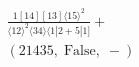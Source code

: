 \documentclass[varwidth, border=5pt]{standalone}
\begin{document}
\begin{my}
$\begin{gathered}
\scriptscriptstyle\frac{1[14][13]⟨15⟩^2}{⟨12⟩^2⟨34⟩⟨1|2+5|1]}+\\
\scriptscriptstyle(21435,\;\text{False},\;-)\phantom{+}
\end{gathered}$
\end{my}
\end{document}

